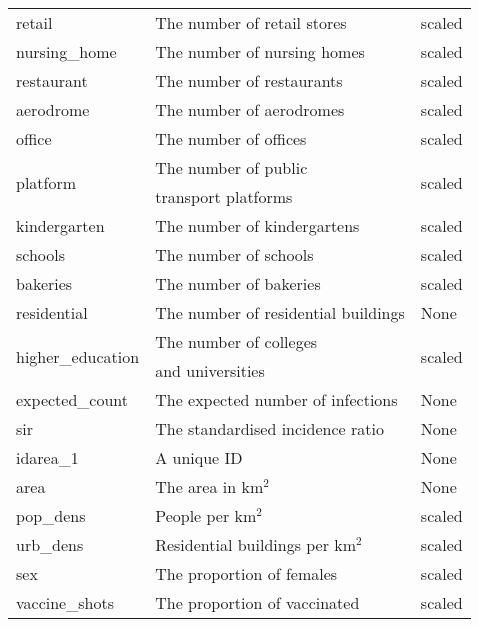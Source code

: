 \begin{table}[H]
\begin{tabular}{l l l}
retail & The number of retail stores & scaled \\
nursing\_home & The number of nursing homes & scaled \\
restaurant & The number of restaurants & scaled \\
aerodrome & The number of aerodromes & scaled \\
office & The number of offices & scaled \\
\multirow{2}{*}{platform} & The number of public & \multirow{2}{*}{scaled} \\
& transport platforms \\
kindergarten & The number of kindergartens & scaled \\
schools & The number of schools & scaled \\
bakeries & The number of bakeries & scaled \\
residential & The number of residential buildings & None \\
\multirow{2}{*}{higher\_education} & The number of colleges & \multirow{2}{*}{scaled} \\
& and universities \\
expected\_count & The expected number of infections & None \\
sir & The standardised incidence ratio & None \\
idarea\_1 & A unique ID & None \\
area & The area in km$^2$ & None \\
pop\_dens & People per km$^2$ & scaled\\
\multirow{1}{*}{urb\_dens} &  Residential buildings per km$^2$ & scaled \\
sex & The proportion of females & scaled \\
vaccine\_shots & The proportion of vaccinated & scaled \\
\bottomrule
\end{tabular}
\end{table}
